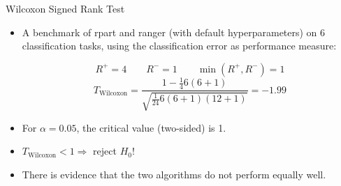 \documentclass[11pt,compress,t,notes=noshow, aspectratio=169, xcolor=table]{beamer}
\begin{document}
\begin{frame}{Wilcoxon Signed Rank Test}
    \begin{itemize}
        \item A benchmark of rpart and ranger (with default hyperparameters) on 6 classification tasks, using the classification error as performance measure:
    {   
        \scriptsize
        
    }

$$
    R^{+} = 4\qquad R^{-} = 1\qquad \min(R^{+}, R^{-}) = 1
    $$
    $$
    T_{\text{Wilcoxon}} = \frac{1 - \frac{1}{4}6(6 + 1)}{\sqrt{\frac{1}{24}6(6 + 1)(12 + 1)}} = - 1.99 
    $$
    \item For $\alpha = 0.05$, the critical value (two-sided) is 1.
    \item $T_{\text{Wilcoxon}} < 1 \Rightarrow$ reject $H_0$! 
    \item There is evidence that the two algorithms do not perform equally well.
\end{itemize}

\end{frame}
\end{document}
